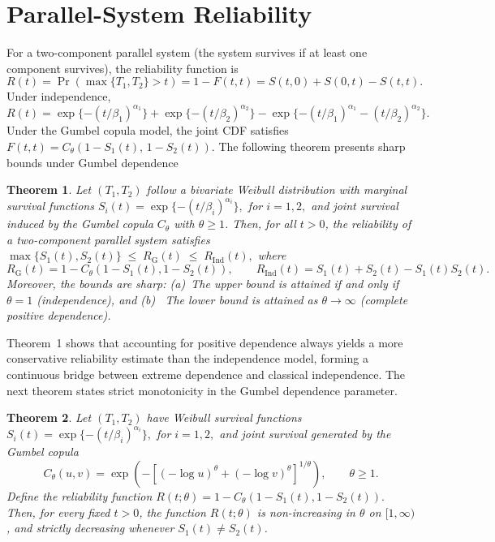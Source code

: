 \documentclass[twoside]{article}
\theoremstyle{plain}
\newtheorem{theorem}{Theorem}[section]
\theoremstyle{definition}
\begin{document}
\section{Parallel-System Reliability}
For a two-component parallel system (the system survives if at least one component survives), the reliability function is
\begin{equation}
R(t)=\Pr(\max\{T_1,T_2\}>t)
    =1-F(t,t)
    =S(t,0)+S(0,t)-S(t,t).
\end{equation}
Under independence,
\begin{equation}
R(t)=\exp\{-(t/\beta_1)^{\alpha_1}\}
     +\exp\{-(t/\beta_2)^{\alpha_2}\}
     -\exp\{-(t/\beta_1)^{\alpha_1}-(t/\beta_2)^{\alpha_2}\}.
\end{equation}
Under the Gumbel copula model, the joint CDF satisfies
$ 
F(t,t)=C_\theta\!\left(1-S_1(t),\,1-S_2(t)\right).
$  
The following theorem presents sharp bounds under Gumbel dependence
\begin{theorem}
Let $(T_1,T_2)$ follow a bivariate Weibull distribution with marginal survival functions
$  
S_i(t)=\exp\{-(t/\beta_i)^{\alpha_i}\}, 
$ for $i=1,2,  $
and joint survival induced by the Gumbel copula $C_\theta$ with $\theta\ge1$.
Then, for all $t>0$, the reliability of a two-component parallel system satisfies
$  
\max\{S_1(t),S_2(t)\}
\;\le\;
R_{\mathrm{G}}(t)
\;\le\;
R_{\mathrm{Ind}}(t),
$  
where
\begin{equation}
R_{\mathrm{G}}(t)=1-C_\theta(1-S_1(t),1-S_2(t)),
\qquad
R_{\mathrm{Ind}}(t)=S_1(t)+S_2(t)-S_1(t)S_2(t).
\end{equation}
Moreover, the bounds are \emph{sharp}:
(a)~The upper bound is attained if and only if $\theta=1$ (independence), and
(b)~ The lower bound is attained as $\theta\to\infty$ (complete positive dependence).
\end{theorem}
Theorem~1 shows that accounting for positive dependence always yields a more conservative reliability estimate than the independence model, forming a continuous bridge between extreme dependence and classical independence.
The next theorem states strict monotonicity in the Gumbel dependence parameter.
\begin{theorem}
Let $(T_1,T_2)$ have Weibull survival functions
$  
S_i(t)=\exp\{-(t/\beta_i)^{\alpha_i}\}, 
$  for $ i=1,2, $
and joint survival generated by the Gumbel copula
\begin{equation}
C_\theta(u,v)
=
\exp\!\left(
-\left[(-\log u)^\theta + (-\log v)^\theta\right]^{1/\theta}
\right),
\qquad \theta\ge1.
\end{equation}
Define the reliability function
$  
R(t;\theta)=1-C_\theta(1-S_1(t),1-S_2(t)).
$  
Then, for every fixed $t>0$, the function $R(t;\theta)$ is non-increasing in $\theta$ on $[1,\infty)$, and strictly decreasing whenever $S_1(t)\neq S_2(t)$.
\end{theorem}
\end{document}
